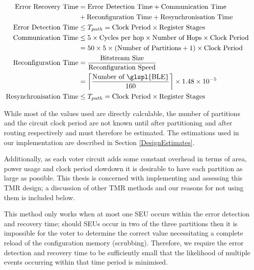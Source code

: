 \documentclass[12pt,final,oneside]{dwThesis} %
\begin{document}
   \begin{align}
      \mbox{Error Recovery Time} &=\mbox{Error Detection Time} +\mbox{Communication Time} \notag\\
      &+\mbox{Reconfiguration Time} + \mbox{Resynchronisation Time}\notag\\
      \mbox{Error Detection Time} &\le T_{path} = \mbox{Clock
         Period}\times\mbox{Register Stages}\notag\\
      \mbox{Communication Time}
      &\le 5\times \mbox{Cycles per hop}\times\mbox{Number of Hops}\times \mbox{Clock Period}\notag\\
      &= 50\times 5\times (\mbox{Number of
         Partitions}+1)\times \mbox{Clock Period}\notag\\
      \mbox{Reconfiguration
         Time} &= \frac{\mbox{Bitstream
            Size}}{\mbox{Reconfiguration Speed}}\notag\\
      &=\left\lceil \frac{\mbox{Number of
            \glspl{BLE}}}{160}\right\rceil\times 1.48\times10^{-5}\notag\\
      \mbox{Resynchronisation Time} &\le T_{path} = \mbox{Clock
         Period}\times\mbox{Register Stages}\notag\\
   \end{align}
   
   While most of the values used are directly calculable, the number of partitions and the circuit clock period are
   not known until after partitioning and after routing respectively and must therefore be estimated.
   The estimations used in our implementation are described in Section \ref{DesignEstimates}.


   Additionally, as each voter circuit adds some constant overhead in terms of
   area, power usage and clock period slowdown it is desirable to have each
   partition as large as possible. This thesis is concerned with implementing
   and assessing this \gls{TMR} design; a discussion of other \gls{TMR} methods
   and our reasons for not using them is included below.

   This method only works when at most one \gls{SEU} occurs within the error
   detection and recovery time; should \glspl{SEU} occur in two of the three
   partitions then it is impossible for the voter to determine the correct
   value necessitating a complete reload of the configuration memory
   (\gls{scrubbing}). Therefore, we require the error detection and recovery
   time to be sufficiently small that the likelihood of multiple events
   occurring within that time period is minimised.
\end{document}
